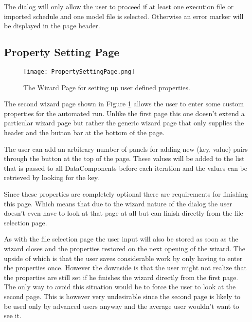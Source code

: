 The dialog will only allow the user to proceed if at least one execution file or imported schedule and one
model file is selected. Otherwise an error marker will be displayed in the page header.

\subsection{Property Setting Page}
\label{section:PropertySettingPage}
\begin{figure}[Property Setting Page]
  \centering
  \texttt{[image: PropertySettingPage.png]}
  \caption[The Wizard Page for setting up user defined properties.]%
  {The Wizard Page for setting up user defined properties.\protect}
  \label{fig:PropertySettingPage}
\end{figure}
The second wizard page shown in Figure \ref{fig:PropertySettingPage} allows the user to enter some custom
properties for the automated run. Unlike the first page this one doesn't extend a particular wizard page but
rather the generic wizard page that only supplies the header and the button bar at the bottom of the page.

The user can add an arbitrary number of panels for adding new (key, value) pairs through the button at the
top of the page. These values will be added to the list that is passed to all DataComponents before each iteration
and the values can be retrieved by looking for the key.

Since these properties are completely optional there are requirements for finishing this page. Which means that due
to the wizard nature of the dialog the user doesn't even have to look at that page at all but can finish directly
from the file selection page.

As with the file selection page the user input will also be stored as soon as the wizard closes and the properties
restored on the next opening of the wizard. The upside of which is that the user saves considerable work by only
having to enter the properties once. However the downside is that the user might not realize that the properties are
still set if he finishes the wizard directly from the first page. The only way to avoid this situation would be to
force the user to look at the second page. This is however very undesirable since the second page is likely to be used
only by advanced users anyway and the average user wouldn't want to see it.

